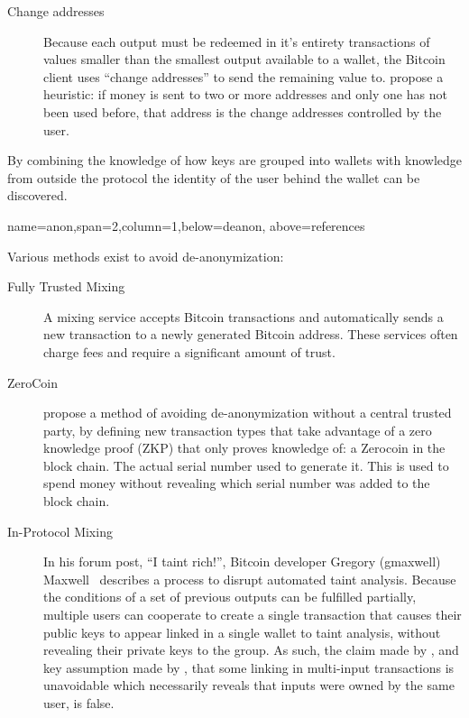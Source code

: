 \documentclass[a0paper,portrait]{baposter}
\begin{document}
\begin{poster}
{\begin{multicols}{2}
\begin{description}
\item[Change addresses]
Because each output must be redeemed in it's entirety transactions of values smaller than the smallest output available to a wallet, the Bitcoin client uses ``change addresses'' to send the remaining value to.\textcite{eval-priv} propose a heuristic: if money is sent to two or more addresses and only one has not been used before, that address is the change addresses controlled by the user.
\end{description}
By combining the knowledge of how keys are grouped into wallets with knowledge from outside the protocol the identity of the user behind the wallet can be discovered\cite{reid-anon}.
\end{multicols}
}


{name=anon,span=2,column=1,below=deanon, above=references}{
\begin{multicols}{2}
Various methods exist to avoid de-anonymization:
\begin{description}
\item[Fully Trusted Mixing]
A mixing service accepts Bitcoin transactions and automatically sends a new transaction to a newly generated Bitcoin address.  These services often charge fees and require a significant amount of trust.
\item[ZeroCoin]
\textcite{zerocoin} propose a method of avoiding de-anonymization without a central trusted party, by defining new transaction types that take advantage of a zero knowledge proof (ZKP) that only proves knowledge of: a Zerocoin in the block chain. The actual serial number used to generate it. This is used to spend money without revealing which serial number was added to the block chain.

\item[In-Protocol Mixing]
In his forum post, ``I taint rich!'', Bitcoin developer Gregory (gmaxwell) Maxwell~\cite{taint-rich} describes a process to disrupt automated taint analysis.  Because the conditions of a set of previous outputs can be fulfilled partially, multiple users can cooperate to create a single transaction that causes their public keys to appear linked in a single wallet to taint analysis, without revealing their private keys to the group.  As such, the claim made by \textcite{satoshi}, and key assumption made by \textcite{reid-anon}, that some linking in multi-input transactions is unavoidable which necessarily reveals that inputs were owned by the same user, is false.


\end{description}
\end{multicols}}
\end{poster}
\end{document}
